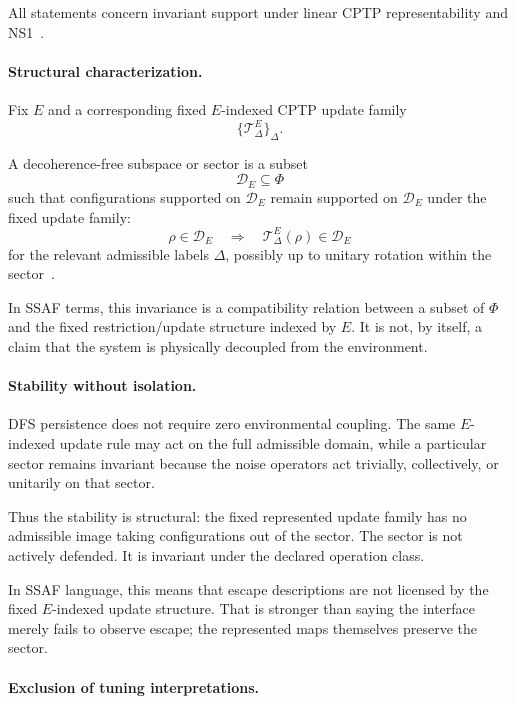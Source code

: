 \documentclass[aps,prx,onecolumn,11pt]{revtex4-2}
\theoremstyle{plain}
\theoremstyle{definition}
\theoremstyle{remark}
\begin{document}
All statements concern invariant support under linear CPTP
representability and NS1~\cite{Lindblad1976,Gorini1976}.

\paragraph{Structural characterization.}

Fix \(E\) and a corresponding fixed \(E\)-indexed CPTP update family
\[
\{\mathcal T^E_\Delta\}_\Delta .
\]

A decoherence-free subspace or sector is a subset
\[
\mathcal D_E\subseteq \Phi
\]
such that configurations supported on \(\mathcal D_E\) remain supported
on \(\mathcal D_E\) under the fixed update family:
\[
\rho\in\mathcal D_E
\quad\Longrightarrow\quad
\mathcal T^E_\Delta(\rho)\in\mathcal D_E
\]
for the relevant admissible labels \(\Delta\), possibly up to unitary
rotation within the sector~\cite{Zanardi1997,Lidar1998}.

In SSAF terms, this invariance is a compatibility relation between a
subset of \(\Phi\) and the fixed restriction/update structure indexed
by \(E\). It is not, by itself, a claim that the system is physically
decoupled from the environment.

\paragraph{Stability without isolation.}

DFS persistence does not require zero environmental coupling. The same
\(E\)-indexed update rule may act on the full admissible domain, while
a particular sector remains invariant because the noise operators act
trivially, collectively, or unitarily on that sector.

Thus the stability is structural: the fixed represented update family
has no admissible image taking configurations out of the sector. The
sector is not actively defended. It is invariant under the declared
operation class.

In SSAF language, this means that escape descriptions are not licensed
by the fixed \(E\)-indexed update structure. That is stronger than
saying the interface merely fails to observe escape; the represented
maps themselves preserve the sector.

\paragraph{Exclusion of tuning interpretations.}
\end{document}
